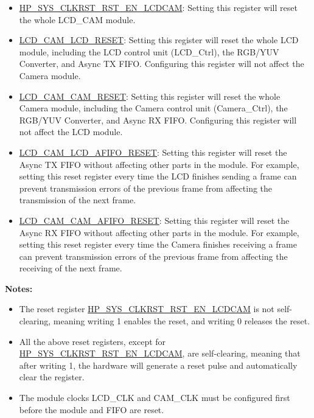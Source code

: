 \documentclass[main\_\_EN.tex]{subfiles}
\begin{document}
\begin{itemize}
    \item \hyperref[fielddesc:HPSYSCLKRSTRSTENLCDCAM]{HP\_SYS\_CLKRST\_RST\_EN\_LCDCAM}: Setting this register will reset the whole LCD\_CAM module.
    \item \hyperref[fielddesc:LCDCAMLCDRESET]{LCD\_CAM\_LCD\_RESET}: Setting this register will reset the whole LCD module, including the LCD control unit (LCD\_Ctrl), the RGB/YUV Converter, and Async TX FIFO. Configuring this register will not affect the Camera module.
    \item \hyperref[fielddesc:LCDCAMCAMRESET]{LCD\_CAM\_CAM\_RESET}: Setting this register will reset the whole Camera module, including the Camera control unit (Camera\_Ctrl), the RGB/YUV Converter, and Async RX FIFO. Configuring this register will not affect the LCD module.
    \item \hyperref[fielddesc:LCDCAMLCDAFIFORESET]{LCD\_CAM\_LCD\_AFIFO\_RESET}: Setting this register will reset the Async TX FIFO without affecting other parts in the module. For example, setting this reset register every time the LCD finishes sending a frame can prevent transmission errors of the previous frame from affecting the transmission of the next frame.
    \item \hyperref[fielddesc:LCDCAMCAMAFIFORESET]{LCD\_CAM\_CAM\_AFIFO\_RESET}: Setting this register will reset the Async RX FIFO without affecting other parts in the module. For example, setting this reset register every time the Camera finishes receiving a frame can prevent transmission errors of the previous frame from affecting the receiving of the next frame.
\end{itemize}

{\bfseries Notes: }
\begin{itemize}
    \item The reset register \hyperref[fielddesc:HPSYSCLKRSTRSTENLCDCAM]{HP\_SYS\_CLKRST\_RST\_EN\_LCDCAM} is not self-clearing, meaning writing 1 enables the reset, and writing 0 releases the reset.
    \item All the above reset registers, except for \hyperref[fielddesc:HPSYSCLKRSTRSTENLCDCAM]{HP\_SYS\_CLKRST\_RST\_EN\_LCDCAM}, are self-clearing, meaning that after writing 1, the hardware will generate a reset pulse and automatically clear the register.
    \item The module clocks LCD\_CLK and CAM\_CLK must be configured first before the module and FIFO are reset.
\end{itemize}
\end{document}
